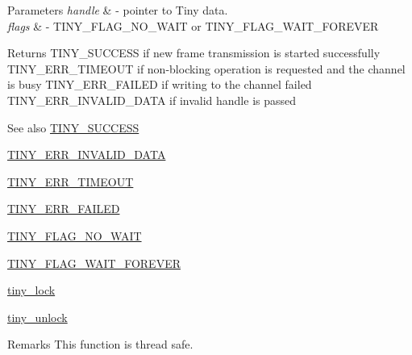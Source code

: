 \begin{DoxyParams}{Parameters}
{\em handle} & -\/ pointer to Tiny data. \\
\hline
{\em flags} & -\/ T\+I\+N\+Y\+\_\+\+F\+L\+A\+G\+\_\+\+N\+O\+\_\+\+W\+A\+IT or T\+I\+N\+Y\+\_\+\+F\+L\+A\+G\+\_\+\+W\+A\+I\+T\+\_\+\+F\+O\+R\+E\+V\+ER \\
\hline
\end{DoxyParams}
\begin{DoxyReturn}{Returns}
T\+I\+N\+Y\+\_\+\+S\+U\+C\+C\+E\+SS if new frame transmission is started successfully T\+I\+N\+Y\+\_\+\+E\+R\+R\+\_\+\+T\+I\+M\+E\+O\+UT if non-\/blocking operation is requested and the channel is busy T\+I\+N\+Y\+\_\+\+E\+R\+R\+\_\+\+F\+A\+I\+L\+ED if writing to the channel failed T\+I\+N\+Y\+\_\+\+E\+R\+R\+\_\+\+I\+N\+V\+A\+L\+I\+D\+\_\+\+D\+A\+TA if invalid handle is passed
\end{DoxyReturn}
\begin{DoxySeeAlso}{See also}
\hyperlink{group__ERROR__FLAGS_ga16cd043c890ed1fa381b3a20f75a626c}{T\+I\+N\+Y\+\_\+\+S\+U\+C\+C\+E\+SS} 

\hyperlink{group__ERROR__FLAGS_ga541a9e67a84e39595ad647d641c4df2e}{T\+I\+N\+Y\+\_\+\+E\+R\+R\+\_\+\+I\+N\+V\+A\+L\+I\+D\+\_\+\+D\+A\+TA} 

\hyperlink{group__ERROR__FLAGS_gac9ba8076a1eb8613e8d1f07629ff0cd1}{T\+I\+N\+Y\+\_\+\+E\+R\+R\+\_\+\+T\+I\+M\+E\+O\+UT} 

\hyperlink{group__ERROR__FLAGS_ga84e6ca143550038e1a71cf36078d1926}{T\+I\+N\+Y\+\_\+\+E\+R\+R\+\_\+\+F\+A\+I\+L\+ED} 

\hyperlink{group__FLAGS__GROUP_gadadd60eb21d7949e6d097ad36aab9b2e}{T\+I\+N\+Y\+\_\+\+F\+L\+A\+G\+\_\+\+N\+O\+\_\+\+W\+A\+IT} 

\hyperlink{group__FLAGS__GROUP_ga3a34267804581c5709d03f52d232b307}{T\+I\+N\+Y\+\_\+\+F\+L\+A\+G\+\_\+\+W\+A\+I\+T\+\_\+\+F\+O\+R\+E\+V\+ER} 

\hyperlink{group__ADVANCED__API_gac318682c20279f9f20ffc6f636a7f1c9}{tiny\+\_\+lock} 

\hyperlink{group__ADVANCED__API_gae4bfad55a4ef5814a5af50f044f6d7cd}{tiny\+\_\+unlock} 
\end{DoxySeeAlso}
\begin{DoxyRemark}{Remarks}
This function is thread safe. 
\end{DoxyRemark}
\mbox{\label{group__ADVANCED__API_ga73c9f1cfb0948bd559d3704749db540b}} 
